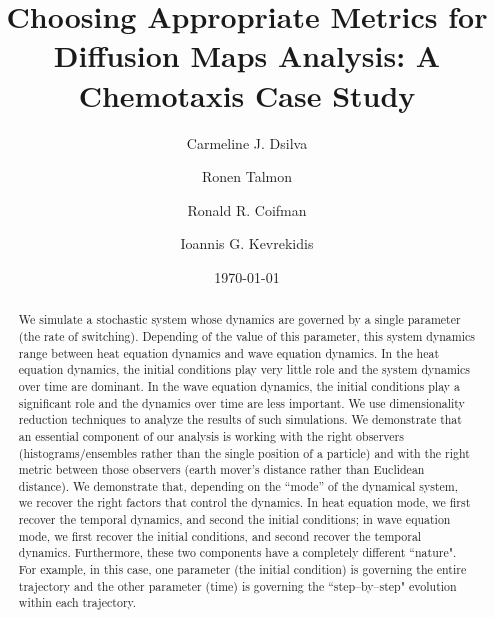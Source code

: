 \documentclass[prl,reprint]{revtex4-1}
\begin{document}
\title{Choosing Appropriate Metrics for Diffusion Maps Analysis: A Chemotaxis Case Study}

\author{Carmeline J. Dsilva}

\author{Ronen Talmon}

\author{Ronald R. Coifman}

\author{Ioannis G. Kevrekidis}

\date{\today}

\begin{abstract}

We simulate a stochastic system whose dynamics are governed by a single parameter (the rate of switching).
%
Depending of the value of this parameter, this system dynamics range between heat equation dynamics and wave equation dynamics. 
%
In the heat equation dynamics, the initial conditions play very little role and the system dynamics over time are dominant. 
%
In the wave equation dynamics, the initial conditions play a significant role and the dynamics over time are less important.
%
We use dimensionality reduction techniques to analyze the results of such simulations.
%
We demonstrate that an essential component of our analysis is working with the right observers (histograms/ensembles rather than the single position of a particle) and with the right metric between those observers (earth mover's distance rather than Euclidean distance).
%
We demonstrate that, depending on the ``mode'' of the dynamical system, we recover the right factors that control the dynamics.
%
In heat equation mode, we­ first recover the temporal dynamics, and second the initial conditions;
in wave equation mode, we­ first recover the initial conditions, and second recover the temporal dynamics. 
%
Furthermore, these two components have a completely different ``nature". 
%
For example, in this case, one parameter (the initial condition) is governing the entire trajectory and the other parameter (time) is governing the ``step­--by­--step" evolution within each trajectory.

\end{abstract}
\end{document}
